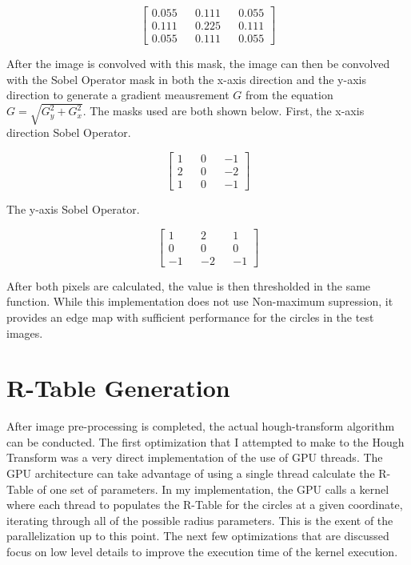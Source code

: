 \documentclass[conference]{IEEEtran}
\begin{document}
\begin{equation}
  \begin{bmatrix}
    0.055 && 0.111 && 0.055 \\
    0.111 && 0.225 && 0.111 \\
    0.055 && 0.111 && 0.055
  \end{bmatrix}
  \label{eq:gaussianKernel}
\end{equation}

After the image is convolved with this mask, the image can then be convolved with the Sobel Operator mask in both the x-axis direction and the y-axis direction to generate a gradient meausrement $G$ from the equation $G = \sqrt{G_y^2 + G_x^2}$. 
The masks used are both shown below. 
First, the x-axis direction Sobel Operator.

\begin{equation}
  \begin{bmatrix}
    1 && 0 && -1 \\
    2 && 0 && -2 \\
    1 && 0 && -1
  \end{bmatrix}
  \label{eq:xSobelOperator}
\end{equation}

The y-axis Sobel Operator. 

\begin{equation}
  \begin{bmatrix}
    1 && 2 && 1 \\
    0 && 0 && 0 \\
    -1 && -2 && -1
  \end{bmatrix}
  \label{eq:ySobelOperator}
\end{equation}

After both pixels are calculated, the value is then thresholded in the same function. While this implementation does not use Non-maximum supression, it provides an edge map with sufficient performance for the circles in the test images. 

\section{R-Table Generation}
After image pre-processing is completed, the actual hough-transform algorithm can be conducted. 
The first optimization that I attempted to make to the Hough Transform was a very direct implementation of the use of GPU threads. 
The GPU architecture can take advantage of using a single thread calculate the R-Table of one set of parameters. 
In my implementation, the GPU calls a kernel where each thread to populates the R-Table for the circles at a given coordinate, iterating through all of the possible radius parameters.
This is the exent of the parallelization up to this point. 
The next few optimizations that are discussed focus on low level details to improve the execution time of the kernel execution. 
\end{document}
